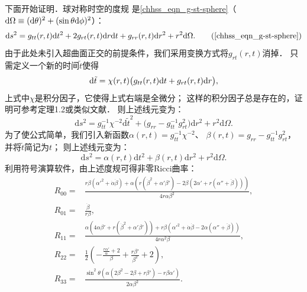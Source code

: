 下面开始证明．球对称时空的度规
是\eqref{chhss_eqn_g-st-sphere}（${\rm d}\Omega\equiv({\rm d}\theta)^2 + (\sin\theta {\rm d}\phi)^2 $）：
\begin{equation}
    \mathrm{d} s^2=  g_{t t}(r, t) \mathrm{d} t^2+2 g_{r t}(r, t) \mathrm{d} r \mathrm{d} t+g_{r r}(r, t) \mathrm{d} r^2 
    +r^2\mathrm{d} \Omega .    \tag{\ref{chhss_eqn_g-st-sphere}}
\end{equation}
由于此处未引入超曲面正交的前提条件，我们采用变换方式将$g_{r t}(r, t)$消掉．
只需定义一个新的{\kaishu 时间}$\tilde{t}$使得
\begin{equation}
    {\rm d}\tilde{t} = \chi(r,t) \bigl(g_{t t}(r, t) \mathrm{d} t+ g_{r t}(r, t) \mathrm{d} r \bigr),
\end{equation}
上式中$\chi$是积分因子，它使得上式右端是全微分；
这样的积分因子总是存在的，证明可参考\parencite[p. 387]{chenwh2017}定理1.2或类似文献．
则上述线元变为：
\begin{equation}
    \mathrm{d} s^2=  g_{t t}^{-1} \chi^{-2} \mathrm{d} \tilde{t}^2+
    \bigl(g_{r r}- g_{t t}^{-1} g_{rt}^{2} \bigr)\mathrm{d} r^2 
    +r^2\mathrm{d} \Omega .
\end{equation}
为了使公式简单，我们引入新函数$\alpha(r,t)= g_{t t}^{-1} \chi^{-2}$、
$\beta(r,t)=g_{r r}- g_{t t}^{-1} g_{rt}^{2}$，并将$\tilde{t}$简记为$t$；
则上述线元变为：
\begin{equation}\label{chsch:eqn_timpshc0}
    \mathrm{d} s^2=  \alpha(r,t) \mathrm{d} t^2+
    \beta(r,t)\mathrm{d} r^2 +r^2\mathrm{d} \Omega .
\end{equation}
利用符号演算软件，由上述度规可得非零Ricci曲率：
\begin{align}
    R_{00} =& \frac{r \beta  ({\alpha'}^2+\dot{\alpha}  \dot{\beta} )
        +\alpha  \left(r (\dot{\beta} ^2+\alpha' \beta')
        -2 \beta  (2 \alpha'+r (\alpha''
        +\ddot{\beta} ))\right)}{4 r \alpha  \beta^2},\\
    R_{01} =& \frac{\dot{\beta} }{r \beta }, \label{chsch:eqn_Rtr}\\
    R_{11} =& \frac{\alpha  \left(4 \alpha  \beta'+r (\dot{\beta} ^2
        +\alpha' \beta')\right)+r \beta  \left(\alpha'^2
        +\dot{\alpha} \dot{\beta} -2 \alpha  (\alpha''
        +\ddot{\beta} )\right)}{4 r \alpha ^2 \beta },\\
    R_{22} =& \frac{1}{2} \left(-\frac{\frac{r \alpha'}{\alpha }+2}{\beta }
    +\frac{r \beta'}{\beta ^2}+2\right),\\
    R_{33} =& \frac{\sin ^2 \theta  \left(\alpha  \left(2 \beta ^2-2 \beta 
        +r \beta'\right)-r \beta  \alpha'\right)}{2 \alpha  \beta ^2} .
\end{align}
